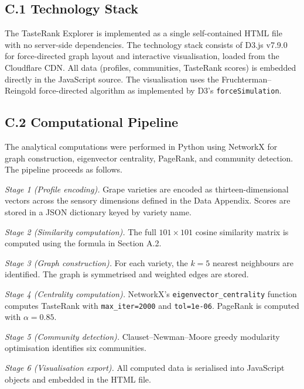 \documentclass[11pt]{article}
\begin{document}
\subsection*{C.1 Technology Stack}
The TasteRank Explorer is implemented as a single self-contained HTML file with no server-side dependencies. The technology stack consists of D3.js v7.9.0 for force-directed graph layout and interactive visualisation, loaded from the Cloudflare CDN. All data (profiles, communities, TasteRank scores) is embedded directly in the JavaScript source. The visualisation uses the Fruchterman--Reingold force-directed algorithm as implemented by D3's \texttt{forceSimulation}.

\subsection*{C.2 Computational Pipeline}
The analytical computations were performed in Python using NetworkX for graph construction, eigenvector centrality, PageRank, and community detection. The pipeline proceeds as follows.

\textit{Stage 1 (Profile encoding).} Grape varieties are encoded as thirteen-dimensional vectors across the sensory dimensions defined in the Data Appendix. Scores are stored in a JSON dictionary keyed by variety name.

\textit{Stage 2 (Similarity computation).} The full $101 \times 101$ cosine similarity matrix is computed using the formula in Section A.2.

\textit{Stage 3 (Graph construction).} For each variety, the $k = 5$ nearest neighbours are identified. The graph is symmetrised and weighted edges are stored.

\textit{Stage 4 (Centrality computation).} NetworkX's \texttt{eigenvector\_centrality} function computes TasteRank with \texttt{max\_iter=2000} and \texttt{tol=1e-06}. PageRank is computed with $\alpha = 0.85$.

\textit{Stage 5 (Community detection).} Clauset--Newman--Moore greedy modularity optimisation identifies six communities.

\textit{Stage 6 (Visualisation export).} All computed data is serialised into JavaScript objects and embedded in the HTML file.
\end{document}
